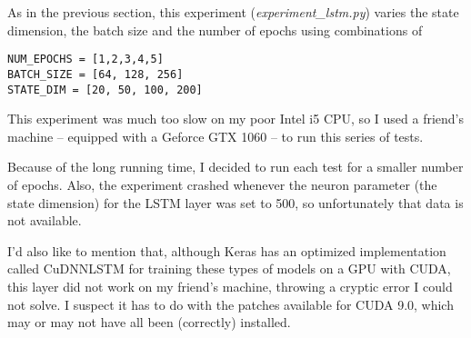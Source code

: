 \documentclass[letterpaper, 10pt]{article}
\begin{document}
As in the previous section, this experiment ({\em experiment\_lstm.py}) varies
the state dimension, the batch size and the number of epochs using combinations of

\begin{verbatim}
NUM_EPOCHS = [1,2,3,4,5]
BATCH_SIZE = [64, 128, 256]
STATE_DIM = [20, 50, 100, 200]
\end{verbatim}

This experiment was much too slow on my poor Intel i5 CPU, so I used a friend's
machine -- equipped with a Geforce GTX 1060 -- to run this series of tests.

Because of the long running time, I decided to run each test
for a smaller number of epochs. Also, the experiment crashed whenever
the neuron parameter (the state dimension) for the LSTM layer was set to 500, so
unfortunately that data is not available.

I'd also like to mention that, although Keras has an optimized implementation
called CuDNNLSTM for training these types of models on a GPU with CUDA,
this layer did not work on my friend's machine, throwing a cryptic error I could not
solve. I suspect it has to do with the patches available for CUDA 9.0, which may or may
not have all been (correctly) installed.

\captionsetup{skip=10pt}
\end{document}
